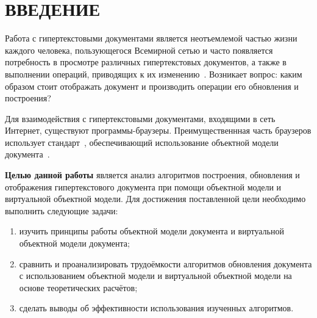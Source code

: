 \section*{ВВЕДЕНИЕ}

Работа с гипертекстовыми документами является неотъемлемой частью жизни каждого человека, пользующегося Всемирной сетью и часто появляется потребность в просмотре различных гипертекстовых документов, а также в выполнении операций, приводящих к их изменению~\cite{hypertext-popular}.
Возникает вопрос: каким образом стоит отображать документ и производить операции его обновления и построения?

Для взаимодействия с гипертекстовыми документами, входящими в сеть Интернет, существуют программы-браузеры.
Преимущественнная часть браузеров использует стандарт~\cite{dom-doc}, обеспечивающий использование объектной модели документа~\cite{dom}. 


\textbf{Целью данной работы} является анализ алгоритмов построения, обновления и отображения гипертекстового документа при помощи объектной модели и виртуальной объектной модели.
Для достижения поставленной цели необходимо выполнить следующие задачи:

\begin{enumerate}[label=\arabic*)]
	\item изучить принципы работы объектной модели документа и виртуальной объектной модели документа;
	\item сравнить и проанализировать трудоёмкости алгоритмов обновления документа с использованием объектной модели и виртуальной объектной модели на основе теоретических расчётов;
	\item сделать выводы об эффективности использования изученных алгоритмов.
\end{enumerate}


\pagebreak